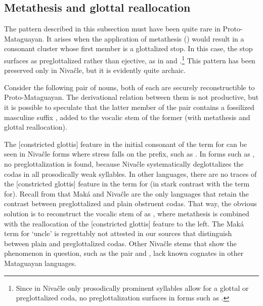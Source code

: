 \subsection{Metathesis and glottal reallocation}\label{metathesis-deglott}

The pattern described in this subsection must have been quite rare in Proto-Mataguayan. It arises when the application of metathesis () would result in a consonant cluster whose first member is a glottalized stop. In this case, the stop surfaces as preglottalized rather than ejective, as in  and  \citep[227]{AnG15}.\footnote{Since in Nivaĉle only prosodically prominent syllables allow for a glottal or preglottalized coda, no preglottalization surfaces in forms such as  \citep[273]{AnG15}.} This pattern has been preserved only in Nivaĉle, but it is evidently quite archaic.

Consider the following pair of nouns, both of each are securely reconstructible to Proto-Mataguayan. The derivational relation between them is not productive, but it is possible to speculate that the latter member of the pair contains a fossilized masculine suffix , added to the vocalic stem of the former (with metathesis and glottal reallocation).

\begin{exe}
    \ex \aunt
    \ex \uncle
\end{exe}

The [constricted glottis] feature in the initial consonant of the term for can be seen in Nivaĉle forms where stress falls on the prefix, such as  \citep[191]{AnG15}. In forms such as , no preglottalization is found, because Nivaĉle systematically deglottalizes the codas in all prosodically weak syllables. In other languages, there are no traces of the [constricted glottis] feature in the term for (in stark contrast with the term for). Recall from  that Maká and Nivaĉle are the only languages that retain the contrast between preglottalized and plain obstruent codas. That way, the obvious solution is to reconstruct the vocalic stem of  as , where metathesis is combined with the reallocation of the [constricted glottis] feature to the left. The Maká term for `uncle' is regrettably not attested in our sources that distinguish between plain and preglottalized codas. Other Nivaĉle stems that show the phenomenon in question, such as the pair  and  \citep[177, 182]{JS16}, lack known cognates in other Mataguayan languages.

